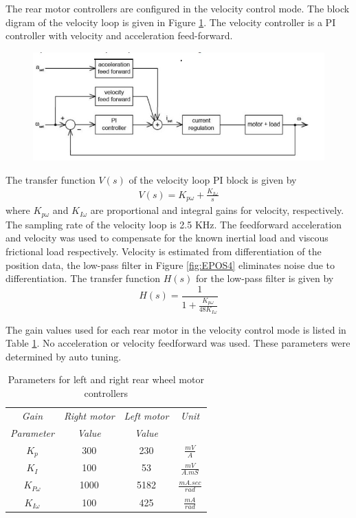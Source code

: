  
  The rear motor controllers are configured in the velocity control mode.  The block digram  of the velocity loop is given in Figure \ref{fig:velloop}. The velocity controller is a PI controller with  velocity and acceleration feed-forward. 
  \begin{figure}
  	\includegraphics[width=\linewidth,keepaspectratio]{Chapter5/fig/velLoop}
  	\label{fig:velloop} 
  \end{figure}
  The transfer function $V(s)$ of the velocity loop PI block is given by
  \begin{eqnarray}
  V(s)=K_{p\omega}+\frac{K_{I\omega}}{s}
  \end{eqnarray}  where $K_{p\omega}$ and  $K_{I\omega}$ are  proportional and integral gains for velocity, respectively.   The sampling rate of the  velocity loop is 2.5 KHz. The feedforward acceleration and  velocity was used to compensate for the known inertial load and  viscous frictional load  \cite{maxonAppNotesPosition} respectively.   Velocity is estimated from differentiation of  the position data, the low-pass filter  in Figure \ref{fig:EPOS4}  eliminates noise due to differentiation. The transfer function $H(s)$ for the  low-pass filter is given by
  \begin{equation}
  H(s)=\frac{1}{1+\frac{K_{p\omega}}{48K_{I\omega}}}
  \end{equation} 
  
  The gain values used for each rear motor in  the velocity control mode is listed in Table \ref{tb:motorPara}. No acceleration or velocity feedforward  was used. These parameters were determined by auto tuning.  
  

  	  \begin{table}[!htbp]
  		\caption{Parameters for left and right rear wheel motor controllers  }
  		\label{tb:motorPara}
  		\centering
  		\begin{tabular}{c c c c}
  			\hline
  			\emph{Gain}  & \emph{ Right motor}  & \emph{ Left motor}& \emph{Unit} \\
  			\emph{ Parameter}  & \emph{ Value} & \emph{ Value} & \emph{\space} \\
  			\hline
  			$K_p$  & 300 & 230 &  $\frac{mV}{A}$ \\ 
  			$K_I $ & 100 & 53 & $\frac{mV}{A.mS}$ \\
  			$K_{P\omega}$& 1000 & 5182 & $ \frac{mA.sec}{rad}$\\
  			$K_{I\omega}$&100 & 425& $\frac{mA}{rad}$\\
  			\hline
  		\end{tabular}
  	\end{table}






